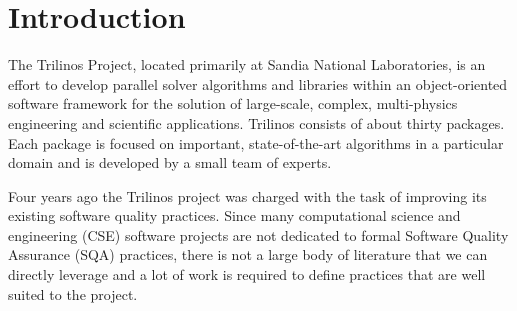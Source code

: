 \documentclass{doublecol}
\begin{document}




\maketitle

\section{Introduction}
\label{Section:Introduction}


The Trilinos Project, located primarily at Sandia National
Laboratories, is an effort to develop parallel solver algorithms and
libraries within an object-oriented software framework for the
solution of large-scale, complex, multi-physics engineering and
scientific applications.  Trilinos consists of about thirty
packages.  Each package is focused on important, state-of-the-art
algorithms in a particular domain and is developed by a small team
of experts.

Four years ago the Trilinos project was charged with the task of
improving its existing software quality practices.  Since many
computational science and engineering (CSE) software projects are
not dedicated to formal Software Quality Assurance (SQA) practices,
there is not a large body of literature that we can directly
leverage and a lot of work is required to define practices that are
well suited to the project.
\end{document}
